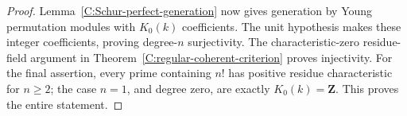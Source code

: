 \begin{proof}
Lemma~\ref{C:Schur-perfect-generation} now gives generation
by Young permutation modules with $K_0(k)$ coefficients.
The unit hypothesis makes these integer coefficients,
proving degree-$n$ surjectivity.  The characteristic-zero
residue-field argument in
Theorem~\ref{C:regular-coherent-criterion} proves injectivity.
For the final assertion, every prime containing $n!$ has
positive residue characteristic for $n\geq2$; the case
$n=1$, and degree zero, are exactly $K_0(k)=\mathbf Z$.
This proves the entire statement.
\end{proof}
